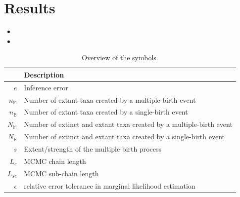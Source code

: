 \documentclass{article}
\begin{document}
\section{Results}
\begin{itemize}

\item

\item

\end{itemize}




\appendix

\begin{table}
  \centering 
  \begin{tabular}{r l}
    \hline
                          & Description\\
    \hline
    \hline
    $e$                   & Inference error \\
    $n_{\mathbb{M}}$      & Number of extant taxa created by a multiple-birth event \\
    $n_{\mathbb{B}}$      & Number of extant taxa created by a single-birth event \\
    $N_{\mathbb{M}}$      & Number of extinct and extant taxa created by a multiple-birth event \\
    $N_{\mathbb{B}}$      & Number of extinct and extant taxa created by a single-birth event \\
    $s$                   & Extent/strength of the multiple birth process \\
    $L_c$                 & MCMC chain length \\
    $L_{sc}$              & MCMC sub-chain length \\
    $\epsilon$            & relative error tolerance in marginal likelihood estimation \\
    \hline
  \end{tabular}
  \caption{
    Overview of the symbols. 
  }
  \label{table:symbols}
\end{table}
\end{document}
